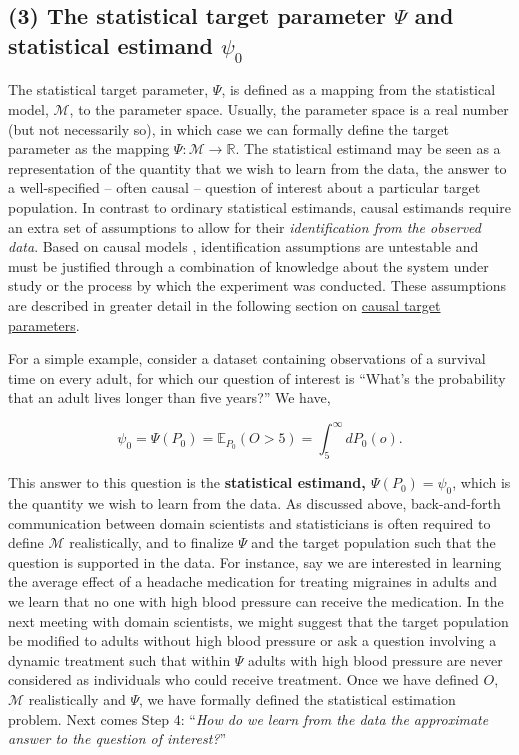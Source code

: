 \documentclass[
  12pt, krantz2,
]{krantz}
\newcommand{\R}{\mathbb{R}}
\newcommand{\E}{\mathbb{E}}
\newcommand{\M}{\mathcal{M}}
\newcommand{\1}{\mathbbm{1}}
\theoremstyle{definition}
\theoremstyle{definition}
\theoremstyle{definition}
\theoremstyle{definition}
\theoremstyle{remark}
\begin{document}
\hypertarget{the-statistical-target-parameter-psi-and-statistical-estimand-psi_0}{%
\subsection*{\texorpdfstring{(3) The statistical target parameter \(\Psi\) and statistical estimand \(\psi_0\)}{(3) The statistical target parameter \textbackslash Psi and statistical estimand \textbackslash psi\_0}}\label{the-statistical-target-parameter-psi-and-statistical-estimand-psi_0}}


The statistical target parameter, \(\Psi\), is defined as a mapping from the
statistical model, \(\M\), to the parameter space. Usually, the parameter space is
a real number (but not necessarily so), in which case we can formally define the
target parameter as the mapping \(\Psi: \M \rightarrow \R\). The statistical
estimand may be seen as a representation of the quantity that we wish to learn
from the data, the answer to a well-specified -- often causal -- question of
interest about a particular target population. In contrast to ordinary
statistical estimands, causal estimands require an extra set of assumptions to
allow for their \emph{identification from the observed data}. Based on causal models
\citep{pearl2009causality, hernan2022causal}, identification assumptions are
untestable and must be justified through a combination of knowledge about the
system under study or the process by which the experiment was conducted. These
assumptions are described in greater detail in the following section on \protect\hyperlink{causal}{causal
target parameters}.

For a simple example, consider a dataset containing observations of a survival
time on every adult, for which our question of interest is ``What's the
probability that an adult lives longer than five years?'' We have,

\begin{equation*}
  \psi_0 = \Psi(P_0) = \E_{P_0}(O > 5) = \int_5^{\infty} dP_0(o).
\end{equation*}

This answer to this question is the \textbf{statistical estimand,
\(\Psi(P_0)=\psi_0\)}, which is the quantity we wish to learn from the data. As
discussed above, back-and-forth communication between domain scientists and
statisticians is often required to define \(\M\) realistically, and to finalize
\(\Psi\) and the target population such that the question is supported in the
data. For instance, say we are interested in learning the average effect of a
headache medication for treating migraines in adults and we learn that no one
with high blood pressure can receive the medication. In the next meeting with
domain scientists, we might suggest that the target population be modified to
adults without high blood pressure or ask a question involving a dynamic
treatment such that within \(\Psi\) adults with high blood pressure are never
considered as individuals who could receive treatment. Once we have defined \(O\),
\(\M\) realistically and \(\Psi\), we have formally defined the statistical
estimation problem. Next comes Step 4: ``\emph{How do we learn from the data the
approximate answer to the question of interest?}''
\end{document}
